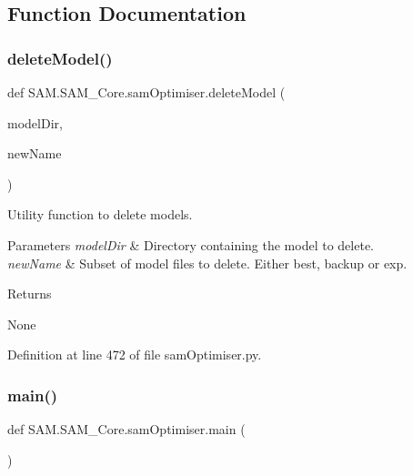 \subsection{Function Documentation}
\mbox{\label{namespaceSAM_1_1SAM__Core_1_1samOptimiser_aaa1732931d8935e827164fbc742a6bc0}} 
\subsubsection{\texorpdfstring{delete\+Model()}{deleteModel()}}
{\footnotesize\ttfamily def S\+A\+M.\+S\+A\+M\+\_\+\+Core.\+sam\+Optimiser.\+delete\+Model (\begin{DoxyParamCaption}\item[{}]{model\+Dir,  }\item[{}]{new\+Name }\end{DoxyParamCaption})}



Utility function to delete models. 


\begin{DoxyParams}{Parameters}
{\em model\+Dir} & Directory containing the model to delete. \\
\hline
{\em new\+Name} & Subset of model files to delete. Either {\ttfamily best}, {\ttfamily backup} or {\ttfamily exp}.\\
\hline
\end{DoxyParams}
\begin{DoxyReturn}{Returns}


None 
\end{DoxyReturn}


Definition at line 472 of file sam\+Optimiser.\+py.

\mbox{\label{namespaceSAM_1_1SAM__Core_1_1samOptimiser_a67ff14e060a0779ce9ecadee717d76a5}} 
\subsubsection{\texorpdfstring{main()}{main()}}
{\footnotesize\ttfamily def S\+A\+M.\+S\+A\+M\+\_\+\+Core.\+sam\+Optimiser.\+main (\begin{DoxyParamCaption}{ }\end{DoxyParamCaption})}



